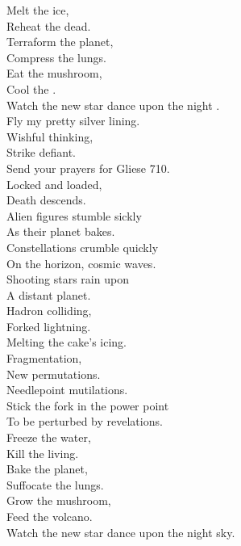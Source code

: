 

Melt the ice, \\
Reheat the dead. \\
Terraform the planet, \\
Compress the lungs. \\
Eat the mushroom, \\
Cool the . \\
Watch the new star dance upon the night . \\

Fly my pretty silver lining. \\
Wishful thinking, \\
Strike defiant. \\
Send your prayers for Gliese 710. \\
Locked and loaded, \\
Death descends. \\

Alien figures stumble sickly \\
As their planet bakes. \\
Constellations crumble quickly \\
On the horizon, cosmic waves. \\
Shooting stars rain upon \\
A distant planet. \\
Hadron colliding, \\
Forked lightning. \\
Melting the cake's icing. \\

Fragmentation, \\
New permutations. \\
Needlepoint mutilations. \\
Stick the fork in the power point \\
To be perturbed by revelations. \\

Freeze the water, \\
Kill the living. \\
Bake the planet, \\
Suffocate the lungs. \\
Grow the mushroom, \\
Feed the volcano. \\
Watch the new star dance upon the night sky. \\

